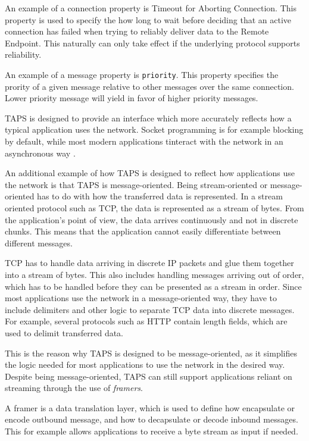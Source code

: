 An example of a connection property is Timeout for Aborting Connection.
This property is used to specify the how long to wait before deciding that an
active connection has failed when trying to reliably deliver data to the Remote Endpoint.
This naturally can only take effect if the underlying protocol supports reliability.

An example of a message property is \texttt{priority}. This property specifies
the prority of a given message relative to other messages over the same connection.
Lower priority message will yield in favor of higher priority messages.

TAPS is designed to provide an interface which more accurately
reflects how a typical application uses the network. Socket programming
is for example blocking by default, while most modern applications
tinteract with the network in an asynchronous way 
\cite{trammellAbstractApplicationProgramming2025}.

An additional
example of how TAPS is designed to reflect how applications
use the network is that TAPS is message-oriented. 
Being stream-oriented or message-oriented has to do with how the
transferred data is represented. In a stream oriented protocol
such as TCP, the data is represented as a stream of bytes. From
the application's point of view, the data arrives continuously
and not in discrete chunks. This means that the application
cannot easily differentiate between different messages. 

TCP has to
handle  data arriving in discrete IP packets and glue them together into
a stream of bytes. This also includes handling messages arriving
out of order, which has to be handled before they can be
presented as a stream in order.
Since most applications
use the network in a message-oriented way, they
have to include delimiters and other logic to separate TCP 
data into discrete messages. For example, several protocols
such as HTTP contain length fields, which are used to delimit
transferred data. 

This is the reason why TAPS is designed to be message-oriented,
as it simplifies the logic needed for most applications to
use the network in the desired way. Despite being message-oriented,
TAPS can still support applications reliant on 
streaming through the use of \textit{framers}.

A framer is a data translation layer, which is used to define
how encapsulate or encode outbound message, and how to decapsulate
or decode inbound messages. This for example allows applications
to receive a byte stream as input if needed.

